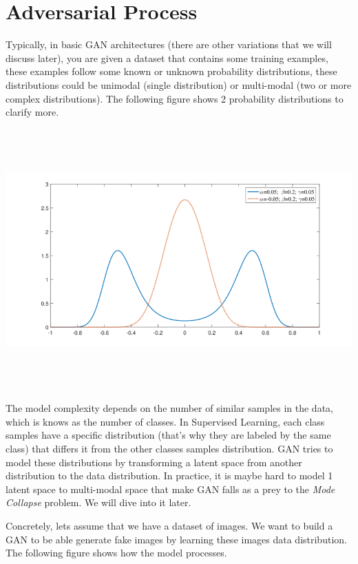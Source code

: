 \documentclass{winnower}
\begin{document}
\section{Adversarial Process}
Typically, in basic GAN architectures (there are other variations that we will discuss later), you are given a dataset that contains some training examples, these examples follow some known or unknown probability distributions, these distributions could be unimodal (single distribution) or multi-modal (two or more complex distributions). The following figure shows 2 probability distributions to clarify more.

\begin{center}
  \includegraphics[width=15cm, height=10cm]{dists.png}
\end{center}

The model complexity depends on the number of similar samples in the data, which is knows as the number of classes. In Supervised Learning, each class samples have a specific distribution (that's why they are labeled by the same class) that differs it from the other classes samples distribution. GAN tries to model these distributions by transforming a latent space from another distribution to the data distribution. In practice, it is maybe hard to model 1 latent space to multi-modal space that make GAN falls as a prey to the \textit{Mode Collapse} problem. We will dive into it later.\newline

Concretely, lets assume that we have a dataset of images. We want to build a GAN to be able generate fake images by learning these images data distribution. The following figure shows how the model processes.
\end{document}
